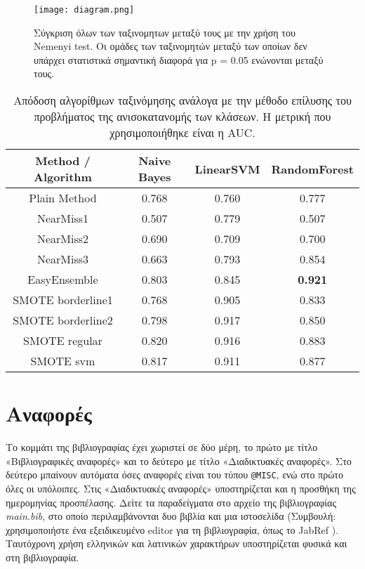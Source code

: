\begin{figure}
	\centering
	\texttt{[image: diagram.png]} %
	\caption{Σύγκριση όλων των ταξινομητων μεταξύ τους με την χρήση του Nemenyi test. Οι ομάδες των ταξινομητών μεταξύ των οποίων δεν υπάρχει στατιστικά σημαντική διαφορά για p = 0.05 ενώνονται μεταξύ τους.}
	\label{fig:balance}
\end{figure}

\begin{table*}
	\centering
	\caption{Απόδοση αλγορίθμων ταξινόμησης ανάλογα με την μέθοδο επίλυσης του προβλήματος της ανισοκατανομής των κλάσεων. Η μετρική που χρησιμοποιήθηκε είναι η AUC.}
	\label{tab: imbalance}
	\begin{tabular}{cccc}
			\hline
		\ttfamily Method / Algorithm & \ttfamily Naive Bayes & \ttfamily LinearSVM & \ttfamily RandomForest 	\\	\hline
		Plain Method & 0.768       & 0.760     & 0.777         \\ \hline
		NearMiss1 & 0.507       & 0.779     & 0.507\\ \hline
		NearMiss2 & 0.690       & 0.709     & 0.700\\ \hline
		NearMiss3 & 0.663       & 0.793     & 0.854\\ \hline
		EasyEnsemble & 0.803       & 0.845     & \textbf{0.921}\\ \hline
		SMOTE borderline1 & 0.768       & 0.905     & 0.833\\ \hline
		SMOTE borderline2 & 0.798       & 0.917     & 0.850\\ \hline
		SMOTE regular & 0.820       & 0.916     & 0.883\\ \hline
		SMOTE svm & 0.817       & 0.911     & 0.877\\ \hline
		

	\end{tabular}
\end{table*}


\section{Αναφορές}

Το κομμάτι της βιβλιογραφίας έχει χωριστεί σε δύο μέρη, το πρώτο με
τίτλο «Βιβλιογραφικές αναφορές» και το δεύτερο με τίτλο «Διαδικτυακές
αναφορές». Στο δεύτερο μπαίνουν αυτόματα όσες αναφορές είναι του τύπου
\verb|@MISC|, ενώ στο πρώτο όλες οι υπόλοιπες. Στις «Διαδικτυακές
αναφορές» υποστηρίζεται και η προσθήκη της ημερομηνίας προσπέλασης.
Δείτε τα παραδείγματα στο αρχείο της βιβλιογραφίας \emph{main.bib}, στο
οποίο περιλαμβάνονται δυο βιβλία \cite{goossens93}\cite{Syropoulos} και
μια ιστοσελίδα \cite{JABREF} (Συμβουλή: χρησιμοποιήστε ένα εξειδικευμένο
editor για τη βιβλιογραφία, όπως το JabRef \cite{JABREF}). Ταυτόχρονη
χρήση ελληνικών και λατινικών χαρακτήρων υποστηρίζεται φυσικά και στη
βιβλιογραφία.

